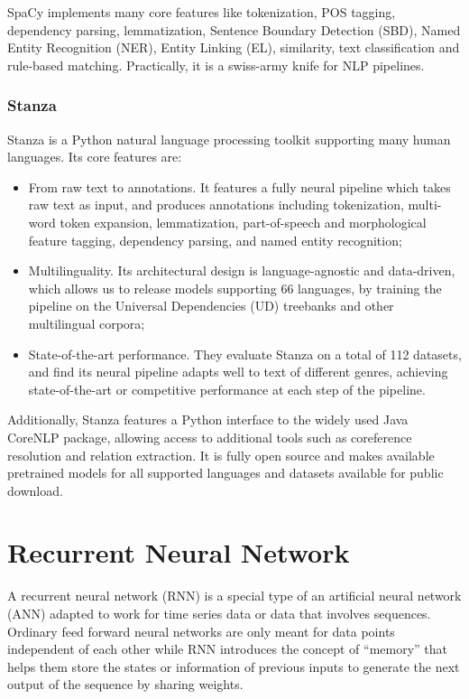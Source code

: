 SpaCy implements many core features like tokenization, POS tagging,
dependency parsing, lemmatization, Sentence Boundary Detection (SBD),
Named Entity Recognition (NER), Entity Linking (EL), similarity, text
classification and rule-based matching. Practically, it is a swiss-army
knife for NLP pipelines.

\subsubsection{Stanza}

Stanza \cite{qi2020stanza} is a Python natural language
processing toolkit supporting many human languages. Its core features are:
\begin{itemize}
  \item From raw text to annotations. It features a fully neural
  pipeline which takes raw text as input, and produces annotations
  including tokenization, multi-word token expansion, lemmatization,
  part-of-speech and morphological feature tagging, dependency
  parsing, and named entity recognition;
  \item Multilinguality. Its architectural design is language-agnostic
  and data-driven, which allows us to release models supporting 66
  languages, by training the pipeline on the Universal Dependencies
  (UD) treebanks and other multilingual corpora;
  \item State-of-the-art performance. They evaluate Stanza on a total
  of 112 datasets, and find its neural pipeline adapts well to text of
  different genres, achieving state-of-the-art or competitive
  performance at each step of the pipeline.
\end{itemize}
Additionally, Stanza features a Python interface to the widely used
Java CoreNLP package, allowing access to additional tools such as
coreference resolution and relation extraction. It is fully open
source and makes available pretrained models for all supported
languages and datasets available for public download.

\section{Recurrent Neural Network}
\label{sec:rnn}

A recurrent neural network (RNN) is a special type of an artificial
neural network (ANN) adapted to work for time series data or data that
involves sequences. Ordinary feed forward neural networks are only
meant for data points independent of each other while RNN introduces
the concept of ``memory'' that helps them store the states or
information of previous inputs to generate the next output of the
sequence by sharing weights.

